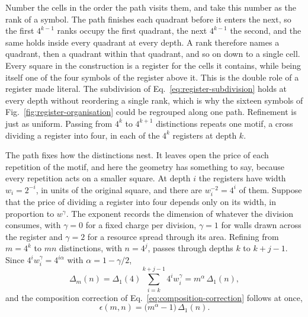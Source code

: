 Number the cells in the order the path visits them, and take this
number as the rank of a symbol. The path finishes each quadrant before
it enters the next, so the first $4^{k-1}$ ranks occupy the first
quadrant, the next $4^{k-1}$ the second, and the same holds inside
every quadrant at every depth. A rank therefore names a quadrant, then
a quadrant within that quadrant, and so on down to a single cell. Every
square in the construction is a register for the cells it contains,
while being itself one of the four symbols of the register above it.
This is the double role of a register made literal. The subdivision of
Eq.~\eqref{eq:register-subdivision} holds at every depth without
reordering a single rank, which is why the sixteen symbols of
Fig.~\ref{fig:register-organisation} could be regrouped along one path.
Refinement is just as uniform. Passing from $4^k$ to $4^{k+1}$
distinctions repeats one motif, a cross dividing a register into four,
in each of the $4^k$ registers at depth $k$.

The path fixes how the distinctions nest. It leaves open the price of
each repetition of the motif, and here the geometry has something to
say, because every repetition acts on a smaller square. At depth $i$
the registers have width $w_i=2^{-i}$, in units of the original square,
and there are $w_i^{-2}=4^i$ of them. Suppose that the price of dividing
a register into four depends only on its width, in proportion to
$w^{\gamma}$. The exponent records the dimension of whatever the
division consumes, with $\gamma=0$ for a fixed charge per division,
$\gamma=1$ for walls drawn across the register and $\gamma=2$ for a
resource spread through its area. Refining from $m=4^k$ to $mn$
distinctions, with $n=4^j$, passes through depths $k$ to $k+j-1$. Since
$4^i w_i^{\gamma}=4^{i\alpha}$ with $\alpha=1-\gamma/2$,
\begin{equation}
  \Delta_m(n)
  =\Delta_1(4)\sum_{i=k}^{k+j-1}4^{i}w_i^{\gamma}
  =m^{\alpha}\,\Delta_1(n),
  \label{eq:geometric-refinement-price}
\end{equation}
and the composition correction of
Eq.~\eqref{eq:composition-correction} follows at once,
\begin{equation}
  \epsilon(m,n)=\bigl(m^{\alpha}-1\bigr)\,\Delta_1(n).
  \label{eq:geometric-correction}
\end{equation}

